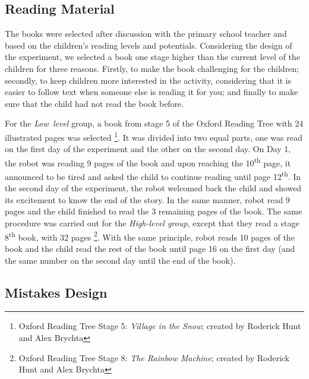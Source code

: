 \documentclass{sigchi}
\newcommand{\ts}{\textsuperscript}
\begin{document}
\subsection{Reading Material}
The books were selected after discussion with the primary school teacher and based on the children's reading levels and potentials.
Considering the design of the experiment, we selected a book one stage higher than the current level of the children for three reasons.
Firstly, to make the book challenging for the children; 
secondly, to keep children more interested in the activity, considering that it is easier to follow text when someone else is reading it for you; and finally
to make sure that the child had not read the book before. 

For the \textit{Low~level} group, a book from stage 5 of the Oxford Reading Tree with 24 illustrated pages was selected \footnote{Oxford Reading Tree Stage 5: \textit{Village in the Snow}; created by Roderick Hunt and Alex Brychta}.
It was divided into two equal parts, one was read on the first day of the experiment and the other on the second day. 
On Day 1,  the robot was reading 9 pages of the book and upon reaching the 10\ts{th} page, it announced to be tired and asked the child to continue reading until page 12\ts{th}. 
In the second day of the experiment, the robot welcomed back the child and showed its excitement to know the end of the story. 
In the same manner, robot read 9 pages and the child finished to read the 3 remaining pages of the book. 
The same procedure was carried out for the \textit{High-level group}, except that they read a stage 8\ts{th} book, with 32 pages \footnote{Oxford Reading Tree Stage 8: \textit{The Rainbow Machine}; created by Roderick Hunt and Alex Brychta}. 
With the same principle, robot reads 10 pages of the book and the child read the rest of the book until page 16 on the first day (and the same number on the second day until the end of the book).


\subsection{Mistakes Design}
\end{document}
